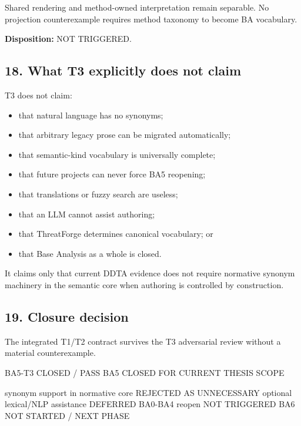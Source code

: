 \documentclass[
  10pt,
  a4paper,
]{article}
\newenvironment{Shaded}{}{}
\newcommand{\NormalTok}[1]{#1}
\providecommand{\tightlist}{%
  \setlength{\itemsep}{0pt}\setlength{\parskip}{0pt}}
\begin{document}
Shared rendering and method-owned interpretation remain separable. No
projection counterexample requires method taxonomy to become BA
vocabulary.

\textbf{Disposition:} NOT TRIGGERED.

\subsection{18. What T3 explicitly does not
claim}\label{18-what-t3-explicitly-does-not-claim}

T3 does not claim:

\begin{itemize}
\tightlist
\item
  that natural language has no synonyms;
\item
  that arbitrary legacy prose can be migrated automatically;
\item
  that semantic-kind vocabulary is universally complete;
\item
  that future projects can never force BA5 reopening;
\item
  that translations or fuzzy search are useless;
\item
  that an LLM cannot assist authoring;
\item
  that ThreatForge determines canonical vocabulary; or
\item
  that Base Analysis as a whole is closed.
\end{itemize}

It claims only that current DDTA evidence does not require normative
synonym machinery in the semantic core when authoring is controlled by
construction.

\subsection{19. Closure decision}\label{19-closure-decision}

The integrated T1/T2 contract survives the T3 adversarial review without
a material counterexample.

\begin{Shaded}
\begin{Highlighting}[]
\NormalTok{BA5{-}T3       CLOSED / PASS}
\NormalTok{BA5          CLOSED FOR CURRENT THESIS SCOPE}

\NormalTok{synonym support in normative core      REJECTED AS UNNECESSARY}
\NormalTok{optional lexical/NLP assistance        DEFERRED}
\NormalTok{BA0{-}BA4 reopen                         NOT TRIGGERED}
\NormalTok{BA6                                    NOT STARTED / NEXT PHASE}
\end{Highlighting}
\end{Shaded}
\end{document}
